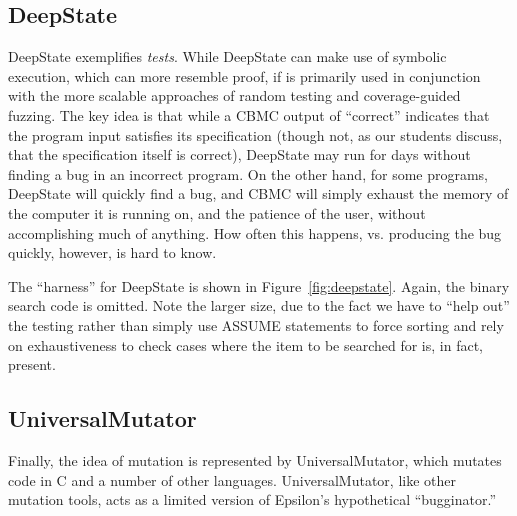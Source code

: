 \documentclass[sigplan]{acmart}
\begin{document}
\subsection{DeepState}

DeepState exemplifies \emph{tests}.  While DeepState can make use of
symbolic execution, which can more resemble proof, if is primarily
used in conjunction with the more scalable approaches of random
testing and coverage-guided fuzzing.  The key idea is that while a
CBMC output of ``correct'' indicates that the program input satisfies
its specification (though not, as our students discuss, that the
specification itself is correct), DeepState may run for days without
finding a bug in an incorrect program.  On the other hand, for some
programs, DeepState will quickly find a bug, and CBMC will simply
exhaust the memory of the computer it is running on, and the patience
of the user, without accomplishing much of anything.  How often this
happens, vs. producing the bug quickly, however, is hard to know.

The ``harness'' for DeepState is shown in Figure~\ref{fig:deepstate}.
Again, the binary search code is omitted.  Note the larger size, due to the fact we
have to ``help out'' the testing rather than simply use ASSUME
statements to force sorting and rely on exhaustiveness to check cases
where the item to be searched for is, in fact, present.

\subsection{UniversalMutator}

Finally, the idea of mutation is represented by UniversalMutator, which mutates code
in C and a number of other languages.  UniversalMutator, like other
mutation tools, acts as a limited version of Epsilon's hypothetical
``bugginator.''




\end{document}
